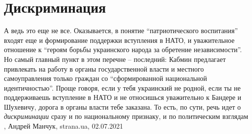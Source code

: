  
 
 
 
 
\chapter{Дискриминация}

А ведь это еще не все. Оказывается, в понятие \enquote{патриотического воспитания}
входят еще и формирование поддержки вступления в НАТО, и уважительное отношение
к \enquote{героям борьбы украинского народа за обретение независимости}.  Но самый
главный пункт в этом перечне – последний: Кабмин предлагает привлекать на
работу в органы государственной власти и местного самоуправления только граждан
со \enquote{сформированной национальной идентичностью}. Проще говоря, если у тебя
украинский не родной, если ты не поддерживаешь вступление в НАТО и не
относишься уважительно к Бандере и Шухевичу, дорога в органы власти тебе
заказана.  То есть, по сути, речь идет о \emph{дискриминации} сразу и по национальному
признаку, и по политическим взглядам
, 
Андрей Манчук, strana.ua, 02.07.2021

